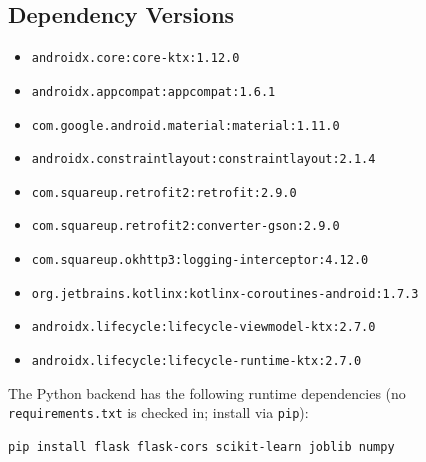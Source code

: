 \documentclass[11pt,a4paper]{article}
\begin{document}
\subsection{Dependency Versions}
\begin{itemize}
\item \texttt{androidx.core:core-ktx:1.12.0}
\item \texttt{androidx.appcompat:appcompat:1.6.1}
\item \texttt{com.google.android.material:material:1.11.0}
\item \texttt{androidx.constraintlayout:constraintlayout:2.1.4}
\item \texttt{com.squareup.retrofit2:retrofit:2.9.0}
\item \texttt{com.squareup.retrofit2:converter-gson:2.9.0}
\item \texttt{com.squareup.okhttp3:logging-interceptor:4.12.0}
\item \texttt{org.jetbrains.kotlinx:kotlinx-coroutines-android:1.7.3}
\item \texttt{androidx.lifecycle:lifecycle-viewmodel-ktx:2.7.0}
\item \texttt{androidx.lifecycle:lifecycle-runtime-ktx:2.7.0}
\end{itemize}
The Python backend has the following runtime dependencies (no \texttt{requirements.txt} is checked in; install via \texttt{pip}):
\begin{lstlisting}[language=bash, caption={Backend dependency install}]
pip install flask flask-cors scikit-learn joblib numpy
\end{lstlisting}
\end{document}
